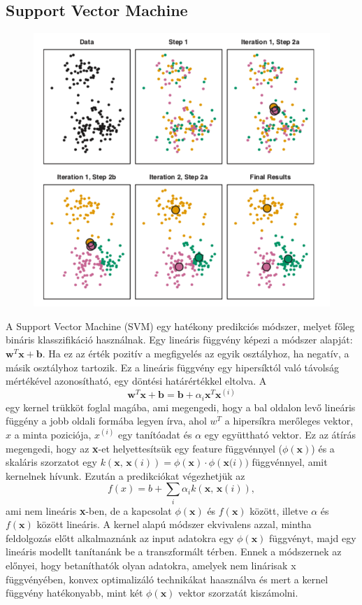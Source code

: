 \documentclass[12pt]{article}
\theoremstyle{plain}
\begin{document}
\subsection{Support Vector Machine}
\begin{figure}
    \begin{center}
    \includegraphics[width=1\textwidth]{media/kmeans.png}
    \caption{} 
    \label{fig:kmeans}
    \end{center}
\end{figure}

A Support Vector Machine (SVM) egy hatékony predikciós módszer, melyet főleg bináris klasszifikáció használnak. Egy lineáris függvény képezi a módszer alapját: 
$ \textbf{w}^T \textbf{x} + \textbf{b} $. Ha ez az érték pozitív a megfigyelés az egyik osztályhoz, ha negatív, a másik osztályhoz tartozik. Ez a lineáris függvény egy hipersíktól való távolság mértékével azonosítható, egy döntési határértékkel eltolva. A $$ \textbf{w}^T\textbf{x}+\textbf{b}=\textbf{b}+\alpha_i \textbf{x}^T \textbf{x}^{(i)}$$ egy kernel trükköt foglal magába, ami megengedi, hogy a bal oldalon levő lineáris függény a jobb oldali formába legyen írva, ahol $w^T$ a hipersíkra merőleges vektor, $x$ a minta poziciója, $x^{(i)}$ egy tanítóadat és $\alpha$ egy együttható vektor. Ez az átírás megengedi, hogy az \textbf{x}-et helyettesítsük egy feature függvénnyel ($\phi(\textbf{x})$) és a skaláris szorzatot egy $k(\textbf{x, x}(i)) = \phi(\textbf{x}) \cdot \phi(\textbf{x(}i))$ függvénnyel, amit kernelnek hívunk.  Ezután a predikciókat végezhetjük az $$ f(x)= b + \sum_i \alpha_i k(\textbf{x, x}(i)),$$ ami nem lineáris \textbf{x}-ben, de a kapcsolat $\phi(\textbf{x}) $ és $f(\textbf{x})$ között, illetve $\alpha$ és $f(\textbf{x}) $ között lineáris. A kernel alapú módszer ekvivalens azzal, mintha feldolgozás előtt alkalmaznánk az input adatokra egy $\phi(\textbf{x})$ függvényt, majd egy lineáris modellt tanítanánk be a transzformált térben. Ennek a módszernek az előnyei, hogy betaníthatók olyan adatokra, amelyek nem linárisak x függvényében, konvex optimalizáló technikákat haasználva és mert a kernel függvény hatékonyabb, mint két $\phi(\textbf{x}) $ vektor szorzatát kiszámolni. 
\end{document}

